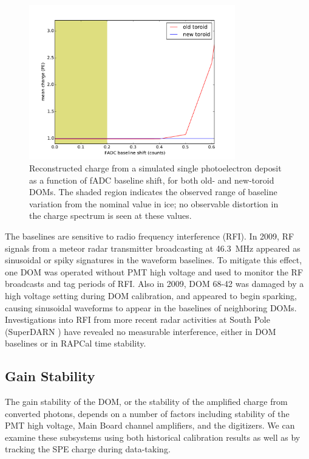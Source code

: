 \begin{figure}[!h]
 \centering
 \includegraphics[width=0.8\textwidth]{graphics/dom/reliability/charge_fadcshift.pdf}
 \caption{Reconstructed charge from a simulated single photoelectron
   deposit as a function of fADC baseline shift, for both old- and
   new-toroid DOMs. The shaded region indicates the observed range of 
   baseline variation from the nominal value in ice; no observable
   distortion in the charge spectrum is seen at these values.}
 \label{fig:charge_fadcshift}
\end{figure}

The baselines are sensitive to radio frequency interference (RFI). In
2009, RF signals from a meteor radar transmitter broadcasting at 46.3~MHz
appeared as sinusoidal or spiky signatures in the waveform
baselines.  To mitigate this effect, one DOM was operated without PMT high
voltage and used to monitor the RF broadcasts and tag periods of RFI.  Also
in 2009, DOM 68-42 was damaged by a high voltage setting during DOM
calibration, and appeared to begin sparking, causing sinusoidal waveforms
to appear in the baselines of neighboring DOMs.  Investigations into RFI
from more recent radar activities at South Pole (SuperDARN
\cite{superdarn}) have revealed no measurable interference, either in DOM
baselines or in RAPCal time stability. 

\subsection{\label{sec:gain_stability} Gain Stability}

The gain stability of the DOM, or the stability of the amplified charge
from converted photons, depends on a number of factors including stability
of the PMT high voltage, Main Board channel amplifiers, and the digitizers.
We can examine these subsystems using both historical calibration results
as well as by tracking the SPE charge during data-taking.

